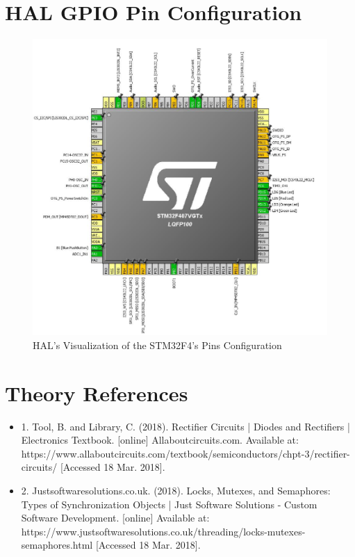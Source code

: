 \documentclass[12pt]{report}
\begin{document}
\begin{appendix}
\begin{lstlisting}[basicstyle=\scriptsize\ttfamily]
	\end{lstlisting}
	
	\newpage
	
	\chapter{HAL GPIO Pin Configuration}\label{pinconfig}
	\begin{figure}[h]
	\label{HAL GPIO Pin Configuration}
		\begin{center}
			\includegraphics[scale=0.7]{./figures/pin_config.PNG}
			\caption{HAL's Visualization of the STM32F4's Pins Configuration}
		\end{center}
	\end{figure}
	\newpage
	
	
	\chapter{Theory References}
	\begin{itemize}
		\item 1. Tool, B. and Library, C. (2018). Rectifier Circuits | Diodes and Rectifiers | Electronics Textbook. [online] Allaboutcircuits.com. Available at: https://www.allaboutcircuits.com/textbook/semiconductors/chpt-3/rectifier-circuits/ [Accessed 18 Mar. 2018].
		\item 2. Justsoftwaresolutions.co.uk. (2018). Locks, Mutexes, and Semaphores: Types of Synchronization Objects | Just Software Solutions - Custom Software Development. [online] Available at: https://www.justsoftwaresolutions.co.uk/threading/locks-mutexes-semaphores.html [Accessed 18 Mar. 2018].
	\end{itemize}
\end{appendix}
\end{document}
